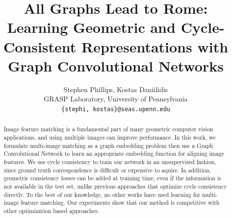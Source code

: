 \documentclass[10pt,twocolumn,letterpaper]{article}
\begin{document}
\title{All Graphs Lead to Rome: Learning Geometric and Cycle-Consistent Representations with Graph Convolutional Networks}

\author{Stephen Phillips, Kostas Daniilidis \\
GRASP Laboratory, University of Pennsylvania\\
{\tt\small \{stephi, kostas\}@seas.upenn.edu}
}



\maketitle


\begin{abstract}
    Image feature matching is a fundamental part of many geometric computer vision applications, and using multiple images can improve performance.
    In this work, we formulate multi-image matching as a graph embedding problem then use a Graph Convolutional Network to learn an appropriate embedding function for aligning image features.
    We use cycle consistency to train our network in an unsupervised fashion, since ground truth correspondence is difficult or expensive to aquire.
    In addition, geometric consistency losses can be added at training time, even if the information is not available in the test set, unlike previous approaches that optimize cycle consistency directly.
    To the best of our knowledge, no other works have used learning for multi-image feature matching.
    Our experiments show that our method is competitive with other optimization based approaches.
\end{abstract}
\end{document}
